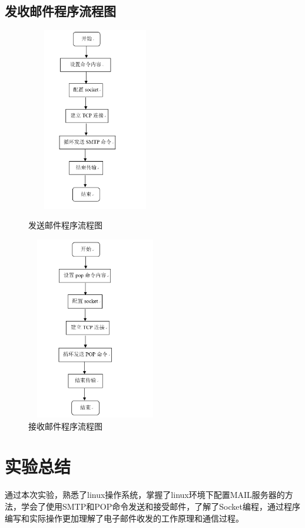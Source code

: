 \documentclass{article}
\begin{document}
\subsection{发收邮件程序流程图}
\begin{figure}[htbp]
\centering
\begin{minipage}[t]{0.48\textwidth}
\centering
\includegraphics[height=8cm,width=6cm]{16.png}
\caption{发送邮件程序流程图}
\end{minipage}
\begin{minipage}[t]{0.48\textwidth}
\centering
\includegraphics[height=8cm,width=6cm]{17.png}
\caption{接收邮件程序流程图}
\end{minipage}
\end{figure}
\section{实验总结}
    通过本次实验，熟悉了linux操作系统，掌握了linux环境下配置MAIL服务器的方法，学会了使用SMTP和POP命令发送和接受邮件，了解了Socket编程，通过程序编写和实际操作更加理解了电子邮件收发的工作原理和通信过程。

%
\end{document}
